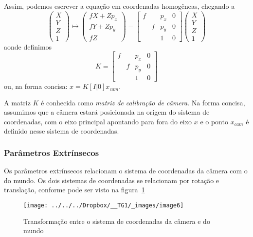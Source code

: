 \documentclass[ecp,tc]{iiufrgs}
\begin{document}
Assim, podemos escrever a equação em coordenadas homogêneas, chegando a
\[\begin{pmatrix} X \\ Y \\ Z \\ 1 \end{pmatrix} \mapsto \begin{pmatrix} fX+Zp_x \\ fY+Zp_y \\ fZ \end{pmatrix} = \begin{bmatrix} f &  & p_x & 0 \\ & f & p_y & 0 \\ & & 1 & 0 \end{bmatrix} \begin{pmatrix} X \\ Y \\ Z \\ 1 \end{pmatrix} \]
aonde definimos
\[K = \begin{bmatrix} f &  & p_x & 0 \\ & f & p_y & 0 \\ & & 1 & 0 \end{bmatrix}\]
ou, na forma concisa: $ x = K[I|0]x_{cam}$.

A matriz $ K $ é conhecida como \textit{matriz de calibração de câmera}. Na forma concisa, assumimos que a câmera estará posicionada na origem do sistema de coordenadas, com o eixo principal apontando para fora do eixo $ x $ e o ponto $ x_{cam} $ é definido nesse sistema de coordenadas.

\subsubsection{Parâmetros Extrínsecos}
\label{sec:extrinsic}
Os parâmetros extrínsecos relacionam o sistema de coordenadas da câmera com o do mundo. Os dois sistemas de coordenadas se relacionam por rotação e translação, conforme pode ser visto na figura~\ref{fig:image6}

\begin{figure}
	\centering
	\caption{Transformação entre o sistema de coordenadas da câmera e do mundo}
	\texttt{[image: ../../../Dropbox/\_\_TG1/\_images/image6]}
	\label{fig:image6}
\end{figure}
\end{document}
